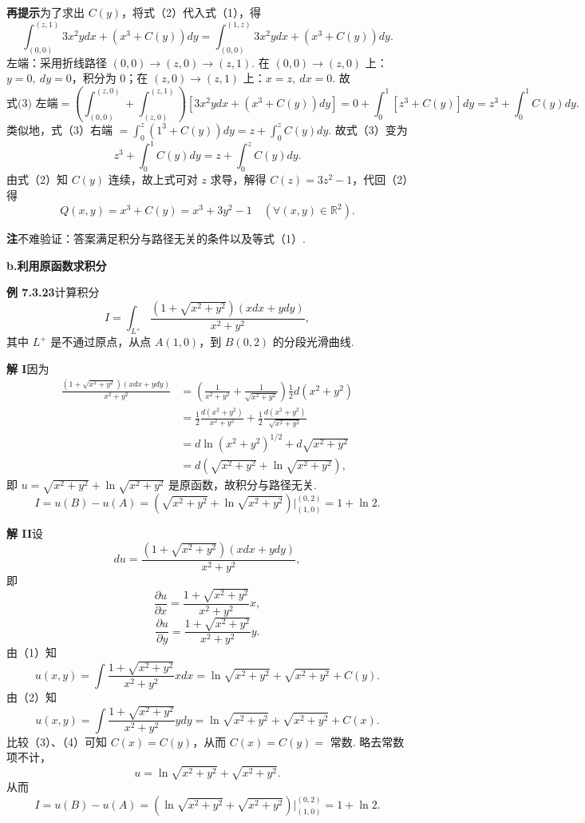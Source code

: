 \documentclass[UTF8, 12pt, fontset=fandol, oneside]{ctexart}
\begin{document}
\noindent\textbf{再提示}\quad 为了求出 $C(y)$，将式（2）代入式（1），得
\[
\int_{(0,0)}^{(z,1)}3x^2ydx+(x^3+C(y))dy
=\int_{(0,0)}^{(1,z)}3x^2ydx+(x^3+C(y))dy. \tag{3}
\]
左端：采用折线路径 $(0,0)\to(z,0)\to(z,1)$. 在 $(0,0)\to(z,0)$ 上：$y=0,\ dy=0$，积分为 0；在 $(z,0)\to(z,1)$ 上：$x=z,\ dx=0$. 故
\[
\text{式(3) 左端}
=\left(\int_{(0,0)}^{(z,0)}+\int_{(z,0)}^{(z,1)}\right)[3x^2ydx+(x^3+C(y))dy]
=0+\int_0^1[z^3+C(y)]dy=z^3+\int_0^1C(y)dy.
\]
类似地，式（3）右端 $=\displaystyle\int_0^z(1^3+C(y))dy=z+\int_0^zC(y)dy$.
故式（3）变为
\[
z^3+\int_0^1C(y)dy=z+\int_0^zC(y)dy.
\]
由式（2）知 $C(y)$ 连续，故上式可对 $z$ 求导，解得 $C(z)=3z^2-1$，代回（2）得
\[
Q(x,y)=x^3+C(y)=x^3+3y^2-1\quad(\forall(x,y)\in\mathbb R^2).
\]

\noindent\textbf{注}\quad 不难验证：答案满足积分与路径无关的条件以及等式（1）.

\noindent\textbf{b.\quad 利用原函数求积分}

\noindent\textbf{例 7.3.23}\quad 计算积分
\[
I=\int_{L^+}\frac{(1+\sqrt{x^2+y^2})(xdx+ydy)}{x^2+y^2},
\]
其中 $L^+$ 是不通过原点，从点 $A(1,0)$，到 $B(0,2)$ 的分段光滑曲线.

\noindent\textbf{解 I}\quad 因为
\[
\begin{aligned}
\frac{(1+\sqrt{x^2+y^2})(xdx+ydy)}{x^2+y^2}
&=\left(\frac1{x^2+y^2}+\frac1{\sqrt{x^2+y^2}}\right)\frac12d(x^2+y^2)\\
&=\frac12\frac{d(x^2+y^2)}{x^2+y^2}
+\frac12\frac{d(x^2+y^2)}{\sqrt{x^2+y^2}}\\
&=d\ln(x^2+y^2)^{1/2}+d\sqrt{x^2+y^2}\\
&=d\left(\sqrt{x^2+y^2}+\ln\sqrt{x^2+y^2}\right),
\end{aligned}
\]
即 $u=\sqrt{x^2+y^2}+\ln\sqrt{x^2+y^2}$ 是原函数，故积分与路径无关.
\[
I=u(B)-u(A)=
\left(\sqrt{x^2+y^2}+\ln\sqrt{x^2+y^2}\right)\Big|_{(1,0)}^{(0,2)}
=1+\ln2.
\]

\noindent\textbf{解 II}\quad 设
\[
du=\frac{(1+\sqrt{x^2+y^2})(xdx+ydy)}{x^2+y^2},
\]
即
\[
\frac{\partial u}{\partial x}
=\frac{1+\sqrt{x^2+y^2}}{x^2+y^2}x, \tag{1}
\]
\[
\frac{\partial u}{\partial y}
=\frac{1+\sqrt{x^2+y^2}}{x^2+y^2}y. \tag{2}
\]
由（1）知
\[
u(x,y)=\int\frac{1+\sqrt{x^2+y^2}}{x^2+y^2}xdx
=\ln\sqrt{x^2+y^2}+\sqrt{x^2+y^2}+C(y). \tag{3}
\]
由（2）知
\[
u(x,y)=\int\frac{1+\sqrt{x^2+y^2}}{x^2+y^2}ydy
=\ln\sqrt{x^2+y^2}+\sqrt{x^2+y^2}+C(x). \tag{4}
\]
比较（3）、（4）可知 $C(x)=C(y)$，从而 $C(x)=C(y)=$ 常数. 略去常数项不计，
\[
u=\ln\sqrt{x^2+y^2}+\sqrt{x^2+y^2}.
\]
从而
\[
I=u(B)-u(A)=
\left(\ln\sqrt{x^2+y^2}+\sqrt{x^2+y^2}\right)\Big|_{(1,0)}^{(0,2)}
=1+\ln2.
\]
\end{document}

